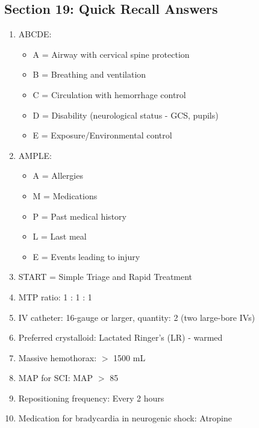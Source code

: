 \documentclass[11pt]{article}
\begin{document}
\subsection*{Section 19: Quick Recall Answers}
\begin{enumerate}
    \item ABCDE:
    \begin{itemize}
        \item A = Airway with cervical spine protection
        \item B = Breathing and ventilation
        \item C = Circulation with hemorrhage control
        \item D = Disability (neurological status - GCS, pupils)
        \item E = Exposure/Environmental control
    \end{itemize}
    
    \item AMPLE:
    \begin{itemize}
        \item A = Allergies
        \item M = Medications
        \item P = Past medical history
        \item L = Last meal
        \item E = Events leading to injury
    \end{itemize}
    
    \item START = Simple Triage and Rapid Treatment
    
    \item MTP ratio: 1 : 1 : 1
    
    \item IV catheter: 16-gauge or larger, quantity: 2 (two large-bore IVs)
    
    \item Preferred crystalloid: Lactated Ringer's (LR) - warmed
    
    \item Massive hemothorax: $>$ 1500 mL
    
    \item MAP for SCI: MAP $>$ 85
    
    \item Repositioning frequency: Every 2 hours
    
    \item Medication for bradycardia in neurogenic shock: Atropine
\end{enumerate}
\end{document}
